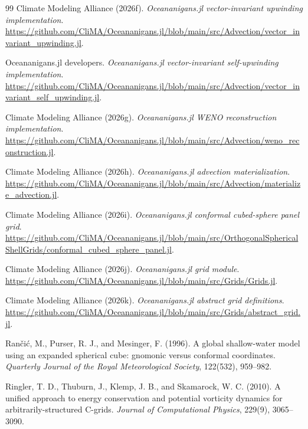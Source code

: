 \documentclass[11pt]{article}
\begin{document}
\begin{thebibliography}{99}
Climate Modeling Alliance (2026f).
\emph{Oceananigans.jl vector-invariant upwinding implementation}.
\url{https://github.com/CliMA/Oceananigans.jl/blob/main/src/Advection/vector_invariant_upwinding.jl}.

Oceananigans.jl developers.
\emph{Oceananigans.jl vector-invariant self-upwinding implementation}.
\url{https://github.com/CliMA/Oceananigans.jl/blob/main/src/Advection/vector_invariant_self_upwinding.jl}.

Climate Modeling Alliance (2026g).
\emph{Oceananigans.jl WENO reconstruction implementation}.
\url{https://github.com/CliMA/Oceananigans.jl/blob/main/src/Advection/weno_reconstruction.jl}.

Climate Modeling Alliance (2026h).
\emph{Oceananigans.jl advection materialization}.
\url{https://github.com/CliMA/Oceananigans.jl/blob/main/src/Advection/materialize_advection.jl}.

Climate Modeling Alliance (2026i).
\emph{Oceananigans.jl conformal cubed-sphere panel grid}.
\url{https://github.com/CliMA/Oceananigans.jl/blob/main/src/OrthogonalSphericalShellGrids/conformal_cubed_sphere_panel.jl}.

Climate Modeling Alliance (2026j).
\emph{Oceananigans.jl grid module}.
\url{https://github.com/CliMA/Oceananigans.jl/blob/main/src/Grids/Grids.jl}.

Climate Modeling Alliance (2026k).
\emph{Oceananigans.jl abstract grid definitions}.
\url{https://github.com/CliMA/Oceananigans.jl/blob/main/src/Grids/abstract_grid.jl}.

Ran\v{c}i\'{c}, M., Purser, R. J., and Mesinger, F. (1996).
A global shallow-water model using an expanded spherical cube: gnomonic versus conformal coordinates.
\emph{Quarterly Journal of the Royal Meteorological Society}, 122(532), 959--982.

Ringler, T. D., Thuburn, J., Klemp, J. B., and Skamarock, W. C. (2010).
A unified approach to energy conservation and potential vorticity dynamics for arbitrarily-structured C-grids.
\emph{Journal of Computational Physics}, 229(9), 3065--3090.


\end{thebibliography}
\end{document}
